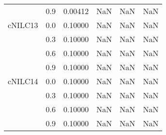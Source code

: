 \begin{longtable}{cccccc}
        & 0.9 & 0.00412 & NaN & NaN & NaN \\
cNILC13 & 0.0 & 0.10000 & NaN & NaN & NaN \\
        & 0.3 & 0.10000 & NaN & NaN & NaN \\
        & 0.6 & 0.10000 & NaN & NaN & NaN \\
        & 0.9 & 0.10000 & NaN & NaN & NaN \\
cNILC14 & 0.0 & 0.10000 & NaN & NaN & NaN \\
        & 0.3 & 0.10000 & NaN & NaN & NaN \\
        & 0.6 & 0.10000 & NaN & NaN & NaN \\
        & 0.9 & 0.10000 & NaN & NaN & NaN \\
\end{longtable}
